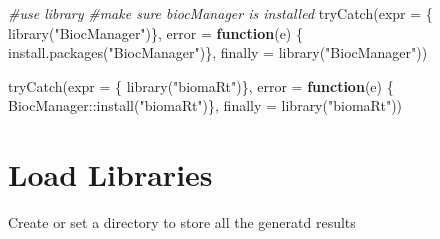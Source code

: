 \documentclass[
]{book}
\newenvironment{Shaded}{\begin{snugshade}}{\end{snugshade}}
\newcommand{\AttributeTok}[1]{\textcolor[rgb]{0.77,0.63,0.00}{#1}}
\newcommand{\CommentTok}[1]{\textcolor[rgb]{0.56,0.35,0.01}{\textit{#1}}}
\newcommand{\ControlFlowTok}[1]{\textcolor[rgb]{0.13,0.29,0.53}{\textbf{#1}}}
\newcommand{\FunctionTok}[1]{\textcolor[rgb]{0.00,0.00,0.00}{#1}}
\newcommand{\NormalTok}[1]{#1}
\newcommand{\OtherTok}[1]{\textcolor[rgb]{0.56,0.35,0.01}{#1}}
\newcommand{\SpecialCharTok}[1]{\textcolor[rgb]{0.00,0.00,0.00}{#1}}
\newcommand{\StringTok}[1]{\textcolor[rgb]{0.31,0.60,0.02}{#1}}
\begin{document}
\begin{Shaded}
\end{Shaded}

\begin{Shaded}
\begin{Highlighting}[]
\CommentTok{\#use library}
\CommentTok{\#make sure biocManager is installed}
\FunctionTok{tryCatch}\NormalTok{(}\AttributeTok{expr =}\NormalTok{ \{ }\FunctionTok{library}\NormalTok{(}\StringTok{"BiocManager"}\NormalTok{)\}, }
         \AttributeTok{error =} \ControlFlowTok{function}\NormalTok{(e) \{ }
           \FunctionTok{install.packages}\NormalTok{(}\StringTok{"BiocManager"}\NormalTok{)\}, }
         \AttributeTok{finally =} \FunctionTok{library}\NormalTok{(}\StringTok{"BiocManager"}\NormalTok{))}


\FunctionTok{tryCatch}\NormalTok{(}\AttributeTok{expr =}\NormalTok{ \{ }\FunctionTok{library}\NormalTok{(}\StringTok{"biomaRt"}\NormalTok{)\}, }
         \AttributeTok{error =} \ControlFlowTok{function}\NormalTok{(e) \{ }
\NormalTok{           BiocManager}\SpecialCharTok{::}\FunctionTok{install}\NormalTok{(}\StringTok{"biomaRt"}\NormalTok{)\}, }
         \AttributeTok{finally =} \FunctionTok{library}\NormalTok{(}\StringTok{"biomaRt"}\NormalTok{))}
\end{Highlighting}
\end{Shaded}

\hypertarget{load-libraries}{%
\section{Load Libraries}\label{load-libraries}}

Create or set a directory to store all the generatd results

\begin{Shaded}
\end{Shaded}
\end{document}
